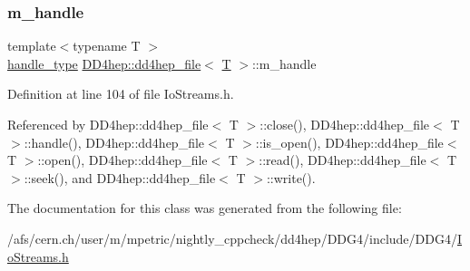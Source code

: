 \subsubsection{\texorpdfstring{m\+\_\+handle}{m\_handle}}
{\footnotesize\ttfamily template$<$typename T $>$ \\
\hyperlink{class_d_d4hep_1_1dd4hep__file_a4d79f8d433cd7831ff818691424cd6fc}{handle\+\_\+type} \hyperlink{class_d_d4hep_1_1dd4hep__file}{D\+D4hep\+::dd4hep\+\_\+file}$<$ \hyperlink{class_t}{T} $>$\+::m\+\_\+handle\hspace{0.3cm}{\ttfamily [private]}}



Definition at line 104 of file Io\+Streams.\+h.



Referenced by D\+D4hep\+::dd4hep\+\_\+file$<$ T $>$\+::close(), D\+D4hep\+::dd4hep\+\_\+file$<$ T $>$\+::handle(), D\+D4hep\+::dd4hep\+\_\+file$<$ T $>$\+::is\+\_\+open(), D\+D4hep\+::dd4hep\+\_\+file$<$ T $>$\+::open(), D\+D4hep\+::dd4hep\+\_\+file$<$ T $>$\+::read(), D\+D4hep\+::dd4hep\+\_\+file$<$ T $>$\+::seek(), and D\+D4hep\+::dd4hep\+\_\+file$<$ T $>$\+::write().



The documentation for this class was generated from the following file\+:\begin{DoxyCompactItemize}
\item 
/afs/cern.\+ch/user/m/mpetric/nightly\+\_\+cppcheck/dd4hep/\+D\+D\+G4/include/\+D\+D\+G4/\hyperlink{_io_streams_8h}{Io\+Streams.\+h}\end{DoxyCompactItemize}
